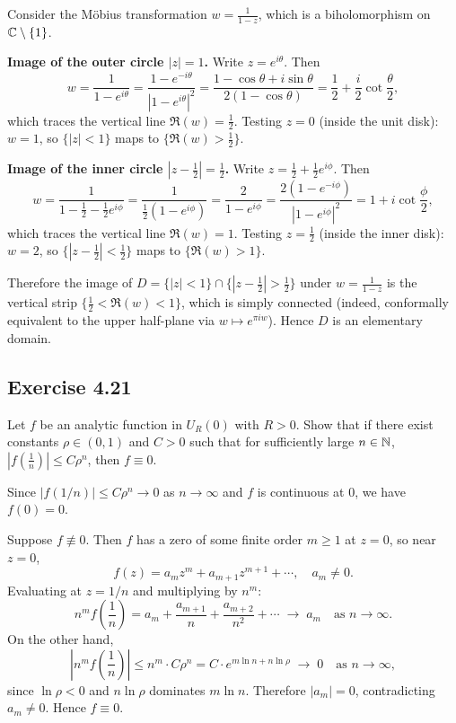 \documentclass{article}
\begin{document}
\begin{solution}
  Consider the M\"obius transformation $w = \frac{1}{1-z}$, which is a
  biholomorphism on $\mathbb{C} \setminus \{1\}$.

  \textbf{Image of the outer circle $|z| = 1$.}
  Write $z = e^{i\theta}$. Then
  \[
    w = \frac{1}{1 - e^{i\theta}}
    = \frac{1 - e^{-i\theta}}{|1 - e^{i\theta}|^2}
    = \frac{1 - \cos\theta + i\sin\theta}{2(1 - \cos\theta)}
    = \frac{1}{2} + \frac{i}{2}\cot\frac{\theta}{2},
  \]
  which traces the vertical line $\Re(w) = \frac{1}{2}$.
  Testing $z = 0$ (inside the unit disk): $w = 1$, so
  $\{|z| < 1\}$ maps to $\{\Re(w) > \frac{1}{2}\}$.

  \textbf{Image of the inner circle $|z - \tfrac{1}{2}| = \tfrac{1}{2}$.}
  Write $z = \frac{1}{2} + \frac{1}{2}e^{i\phi}$. Then
  \[
    w = \frac{1}{1 - \frac{1}{2} - \frac{1}{2}e^{i\phi}}
    = \frac{1}{\frac{1}{2}(1 - e^{i\phi})}
    = \frac{2}{1 - e^{i\phi}}
    = \frac{2(1 - e^{-i\phi})}{|1 - e^{i\phi}|^2}
    = 1 + i\cot\frac{\phi}{2},
  \]
  which traces the vertical line $\Re(w) = 1$.
  Testing $z = \frac{1}{2}$ (inside the inner disk): $w = 2$, so
  $\{|z - \frac{1}{2}| < \frac{1}{2}\}$ maps to $\{\Re(w) > 1\}$.

  Therefore the image of
  $D = \{|z| < 1\} \cap \{|z - \tfrac{1}{2}| > \tfrac{1}{2}\}$
  under $w = \frac{1}{1-z}$ is the vertical strip
  $\{\frac{1}{2} < \Re(w) < 1\}$, which is simply connected
  (indeed, conformally equivalent to the upper half-plane via
  $w \mapsto e^{\pi i w}$). Hence $D$ is an elementary domain.
\end{solution}

\subsection{Exercise 4.21}

Let $f$ be an analytic function in $U_R(0)$ with $R > 0$.
Show that if there exist constants $\rho \in (0,1)$ and $C > 0$
such that for sufficiently large $n \in \mathbb{N}$,
$|f(\tfrac{1}{n})| \le C\rho^n$,
then $f \equiv 0$.

\begin{solution}
  Since $|f(1/n)| \le C\rho^n \to 0$ as $n \to \infty$ and $f$ is
  continuous at $0$, we have $f(0) = 0$.

  Suppose $f \not\equiv 0$. Then $f$ has a zero of some finite order
  $m \ge 1$ at $z = 0$, so near $z = 0$,
  \[
    f(z) = a_m z^m + a_{m+1} z^{m+1} + \cdots, \quad a_m \ne 0.
  \]
  Evaluating at $z = 1/n$ and multiplying by $n^m$:
  \[
    n^m f\!\left(\frac{1}{n}\right)
    = a_m + \frac{a_{m+1}}{n} + \frac{a_{m+2}}{n^2} + \cdots
    \;\longrightarrow\; a_m \quad \text{as } n \to \infty.
  \]
  On the other hand,
  \[
    \left|n^m f\!\left(\frac{1}{n}\right)\right|
    \le n^m \cdot C\rho^n
    = C \cdot e^{m\ln n + n\ln\rho}
    \;\longrightarrow\; 0 \quad \text{as } n \to \infty,
  \]
  since $\ln\rho < 0$ and $n\ln\rho$ dominates $m\ln n$.
  Therefore $|a_m| = 0$, contradicting $a_m \ne 0$.
  Hence $f \equiv 0$.
\end{solution}
\end{document}
